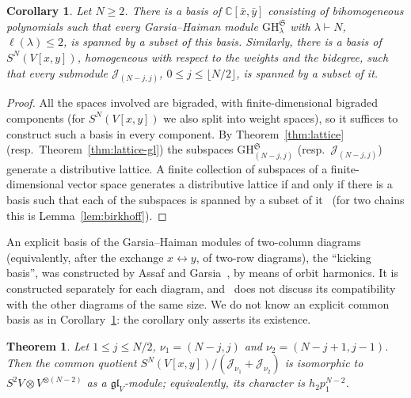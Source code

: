 \documentclass[11pt]{amsart}
\numberwithin{equation}{section}
\newtheorem{theorem}[equation]{Theorem}
\newtheorem{corollary}[equation]{Corollary}
\theoremstyle{definition}
\newcommand{\gl}{\mathfrak{gl}}
\newcommand{\GH}{\mathrm{GH}}         %
\newcommand{\bx}{\bar{x}}
\newcommand{\by}{\bar{y}}
\newcommand{\cJ}{\mathcal{J}}
\begin{document}
	\begin{corollary}\label{cor:common-basis}
		Let $N\ge2$. There is a basis of $\mathbb C[\bx,\by]$ consisting of bihomogeneous polynomials such that every Garsia--Haiman module $\GH^{\mathfrak S}_\lambda$ with $\lambda\vdash N$, $\ell(\lambda)\le2$, is spanned by a subset of this basis. Similarly, there is a basis of $S^N(V[x,y])$, homogeneous with respect to the weights and the bidegree, such that every submodule $\cJ_{(N-j,j)}$, $0\le j\le\lfloor N/2\rfloor$, is spanned by a subset of it.
	\end{corollary}
	\begin{proof}
		All the spaces involved are bigraded, with finite-dimensional bigraded components (for $S^N(V[x,y])$ we also split into weight spaces), so it suffices to construct such a basis in every component. By Theorem~\ref{thm:lattice} (resp.\ Theorem~\ref{thm:lattice-gl}) the subspaces $\GH^{\mathfrak S}_{(N-j,j)}$ (resp.\ $\cJ_{(N-j,j)}$) generate a distributive lattice. A finite collection of subspaces of a finite-dimensional vector space generates a distributive lattice if and only if there is a basis such that each of the subspaces is spanned by a subset of it~\cite[Chapter~1, \S7]{PP} (for two chains this is Lemma~\ref{lem:birkhoff}).
	\end{proof}	
	An explicit basis of the Garsia--Haiman modules of two-column diagrams (equivalently, after the exchange $x\leftrightarrow y$, of two-row diagrams), the ``kicking basis'', was constructed by Assaf and Garsia~\cite{Assaf-Garsia-two_rows}, by means of orbit harmonics. It is constructed separately for each diagram, and~\cite{Assaf-Garsia-two_rows} does not discuss its compatibility with the other diagrams of the same size. We do not know an explicit common basis as in Corollary~\ref{cor:common-basis}: the corollary only asserts its existence.		
	\begin{theorem}\label{thm:N!/2-gl}
		Let $1\le j\le N/2$, $\nu_1=(N-j,j)$ and $\nu_2=(N-j+1,j-1)$. Then the common quotient $S^N(V[x,y])/(\cJ_{\nu_1}+\cJ_{\nu_2})$ is isomorphic to $S^2V\otimes V^{\otimes(N-2)}$ as a $\gl_V$-module; equivalently, its character is $h_2p_1^{N-2}$.
	\end{theorem}
\end{document}

